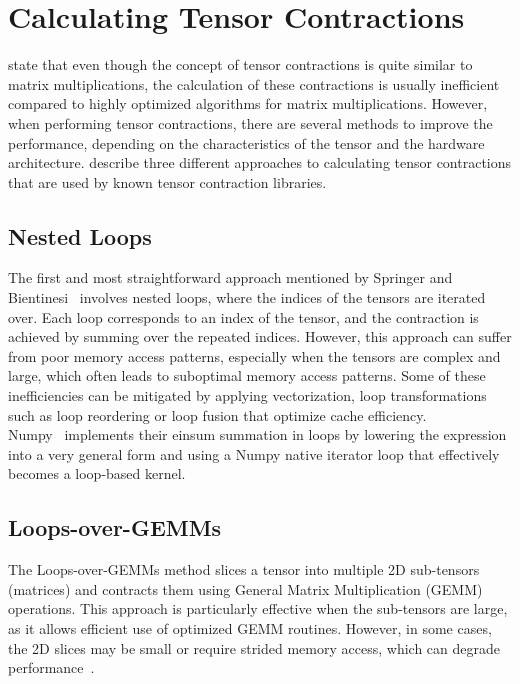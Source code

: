 \section{Calculating Tensor Contractions}
\textcite{springer} state that even though the concept of tensor contractions is quite similar to matrix multiplications, the calculation of these contractions is usually inefficient compared to highly optimized algorithms for matrix multiplications. However, when performing tensor contractions, there are several methods to improve the performance, depending on the characteristics of the tensor and the hardware architecture. \textcite{springer} describe three different approaches to calculating tensor contractions that are used by known tensor contraction libraries.  

\subsection{Nested Loops}
The first and most straightforward approach mentioned by Springer and Bientinesi~\cite{springer} involves nested loops, where the indices of the tensors are iterated over. Each loop corresponds to an index of the tensor, and the contraction is achieved by summing over the repeated indices. However, this approach can suffer from poor memory access patterns, especially when the tensors are complex and large, which often leads to suboptimal memory access patterns. Some of these inefficiencies can be mitigated by applying vectorization, loop transformations such as loop reordering or loop fusion that optimize cache efficiency.\\
Numpy~\cite{Numpy} implements their einsum summation in loops by lowering the expression into a very general form and using a Numpy native iterator loop that effectively becomes a loop-based kernel.

\subsection{Loops-over-GEMMs}
The Loops-over-GEMMs method slices a tensor into multiple 2D sub-tensors (matrices) and contracts them using General Matrix Multiplication (GEMM) operations. This approach is particularly effective when the sub-tensors are large, as it allows efficient use of optimized GEMM routines. However, in some cases, the 2D slices may be small or require strided memory access, which can degrade performance~\cite{springer}.


